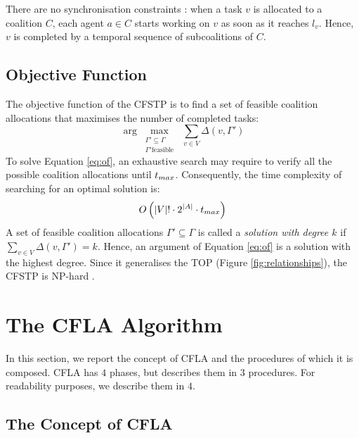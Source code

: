 There are no synchronisation constraints \cite{nunes2017taxonomy}: when a task $v$
is allocated to a coalition $C$, each agent $a \in C$ starts working on $v$ as soon as it
reaches $l_v$. %
Hence, $v$ is completed by a temporal sequence of subcoalitions of $C$.

\subsection{Objective Function}\label{sec:of}

The objective function of the CFSTP is to find a set of feasible coalition
allocations that maximises the number of completed tasks:
\begin{equation}
    \arg \max_{\substack{\Gamma' \subseteq \Gamma\\\Gamma'
    \text{feasible}}}\; \sum_{v \in V} \Delta(v, \Gamma') \label{eq:of}
\end{equation}
To solve Equation \ref{eq:of}, an exhaustive search may require to verify all the possible
coalition allocations until $t_{max}$. Consequently, the time complexity of
searching for an optimal solution is:
\begin{equation}\label{eq:cfstpcomp}
    O \left( |V|! \cdot 2^{|A|} \cdot t_{max} \right)
\end{equation}
A set of feasible coalition allocations $\Gamma' \subseteq \Gamma$ is called a
\emph{solution with degree $k$} if $\sum_{v \in V} \Delta(v, \Gamma') = k$.
Hence, an argument of Equation \ref{eq:of} is a solution with the highest degree. Since
it generalises the TOP (Figure \ref{fig:relationships}), the CFSTP is NP-hard
\cite{papadimitriou1993}.

\section{The CFLA Algorithm}\label{sec:cfla}

In this section, we report the concept of CFLA and the procedures of which it is composed.
CFLA has $4$ phases, but \cite[Section $6$]{ramchurn2010cfstp} describes them in $3$
procedures. For readability purposes, we describe them in $4$.

\subsection{The Concept of CFLA}\label{sec:cfla_gen}

